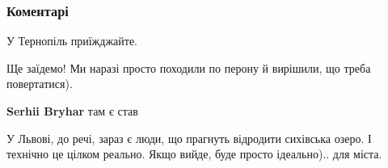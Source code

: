  
 
 
 
 
\subsubsection{Коментарі}
\label{sec:26_07_2021.fb.bryhar_sergej.1.lvov_poezd_rebenok.cmt}

\begin{itemize}
 
У Тернопіль приїжджайте.

\begin{itemize}
 
Ще заїдемо! Ми наразі просто походили по перону й вирішили, що треба повертатися).

 
\textbf{Serhii Bryhar} там є став \Smiley[1.0][yellow]

 

У Львові, до речі, зараз є люди, що прагнуть відродити сихівська озеро. І
технічно це цілком реально. Якщо вийде, буде просто ідеально).. для міста.


 

\end{itemize}
\end{itemize}
